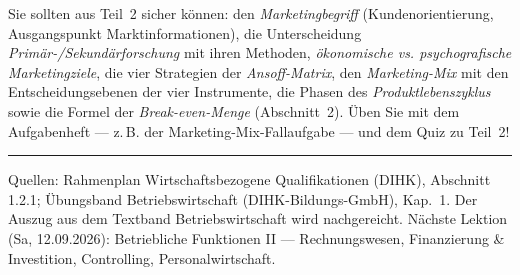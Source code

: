 \documentclass[11pt, a4paper]{article}
\begin{document}
\begin{merksatz}[title={\bfseries Wichtig für die Prüfungsvorbereitung}]
Sie sollten aus Teil~2 sicher können: den \emph{Marketingbegriff} (Kundenorientierung,
Ausgangspunkt Marktinformationen), die Unterscheidung \emph{Primär-/Sekundärforschung}
mit ihren Methoden, \emph{ökonomische vs. psychografische Marketingziele}, die vier
Strategien der \emph{Ansoff-Matrix}, den \emph{Marketing-Mix} mit den
Entscheidungsebenen der vier Instrumente, die Phasen des \emph{Produktlebenszyklus}
sowie die Formel der \emph{Break-even-Menge} (Abschnitt~2). Üben Sie mit dem
Aufgabenheft --- z.\,B. der Marketing-Mix-Fallaufgabe --- und dem Quiz zu Teil~2!
\end{merksatz}

\vspace{1em}
\hrule
\vspace{0.8em}
\noindent\textsf{\small Quellen: Rahmenplan Wirtschaftsbezogene Qualifikationen (DIHK), Abschnitt 1.2.1;
Übungsband Betriebswirtschaft (DIHK-Bildungs-GmbH), Kap.~1. Der Auszug aus dem Textband
Betriebswirtschaft wird nachgereicht. Nächste Lektion (Sa, 12.09.2026): Betriebliche Funktionen II ---
Rechnungswesen, Finanzierung \& Investition, Controlling, Personalwirtschaft.}
\end{document}

